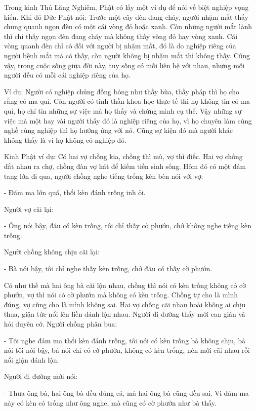 \documentclass[
  12pt,
  oneside]{book}
\begin{document}
Trong kinh Thủ Lăng Nghiêm, Phật có lấy một ví dụ để nói về biệt nghiệp vọng kiến. Khi đó Đức Phật nói: Trước một cây đèn đang cháy, người nhặm mắt thấy chung quanh ngọn đèn có một cái vòng đỏ hoặc xanh. Còn những người mắt lành thì chỉ thấy ngọn đèn đang cháy mà không thấy vòng đỏ hay vòng xanh. Cái vòng quanh đèn chỉ có đối với người bị nhặm mắt, đó là do nghiệp riêng của người bệnh mắt mà có thấy, còn người không bị nhặm mắt thì không thấy. Cũng vậy, trong cuộc sống giữa đời này, tuy sống có mối liên hệ với nhau, nhưng mỗi người đều có mỗi cái nghiệp riêng của họ.

Ví dụ: Người có nghiệp chủng đồng bóng như thầy bùa, thầy pháp thì họ cho rằng có ma quỉ. Còn người có tinh thần khoa học thực tế thì họ không tin có ma quỉ, họ chỉ tin những sự việc mà họ thấy và chứng minh cụ thể. Vậy những sự việc mà một hay vài người thấy đó là nghiệp riêng của họ, vì họ chuyên làm cùng nghề cùng nghiệp thì họ hưởng ứng với nó. Cũng sự kiện đó mà người khác không thấy là vì họ không có nghiệp đó.

Kinh Phật ví dụ: Có hai vợ chồng kia, chồng thì mù, vợ thì điếc. Hai vợ chồng dắt nhau ra chợ, chồng đàn vợ hát để kiếm tiền sinh sống. Hôm đó có một đám tang lớn đi qua, người chồng nghe tiếng trống kèn bèn nói với vợ:

- Đám ma lớn quá, thổi kèn đánh trống inh ỏi.

Người vợ cãi lại:

- Ông nói bậy, đâu có kèn trống, tôi chỉ thấy cờ phướn, chớ không nghe tiếng kèn trống.

Người chồng không chịu cãi lại:

- Bà nói bậy, tôi chỉ nghe thấy kèn trống, chớ đâu có thấy cờ phướn.

Có như thế mà hai ông bà cãi lộn nhau, chồng thì nói có kèn trống không có cờ phướn, vợ thì nói có cờ phướn mà không có kèn trống. Chồng tự cho là mình đúng, vợ cũng cho là mình không sai. Hai vợ chồng cãi nhau hoài không ai chịu thua, giận tức nổi lên liền đánh lộn nhau. Người đi đường thấy mới can gián và hỏi duyên cớ. Người chồng phân bua:

- Tôi nghe đám ma thổi kèn đánh trống, tôi nói có kèn trống bả không chịu, bả nói tôi nói bậy, bả nói chỉ có cờ phướn, không có kèn trống, nên mới cãi nhau rồi nổi giận đánh lộn.

Người đi đường mới nói:

- Thưa ông bà, hai ông bà đều đúng cả, mà hai ông bà cũng đều sai. Vì đám ma này có kèn có trống như ông nghe, mà cũng có cờ phướn như bà thấy.
\end{document}
